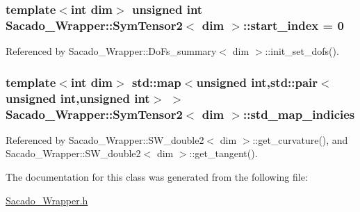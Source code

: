 \subsubsection[{\texorpdfstring{start\+\_\+index}{start_index}}]{\setlength{\rightskip}{0pt plus 5cm}template$<$int dim$>$ unsigned {\bf int} {\bf Sacado\+\_\+\+Wrapper\+::\+Sym\+Tensor2}$<$ dim $>$\+::start\+\_\+index = 0}\hypertarget{classSacado__Wrapper_1_1SymTensor2_ab14d036243a7505e918af354b1cb74d9}{}\label{classSacado__Wrapper_1_1SymTensor2_ab14d036243a7505e918af354b1cb74d9}


Referenced by Sacado\+\_\+\+Wrapper\+::\+Do\+Fs\+\_\+summary$<$ dim $>$\+::init\+\_\+set\+\_\+dofs().

\subsubsection[{\texorpdfstring{std\+\_\+map\+\_\+indicies}{std_map_indicies}}]{\setlength{\rightskip}{0pt plus 5cm}template$<$int dim$>$ std\+::map$<$unsigned {\bf int},std\+::pair$<$unsigned {\bf int},unsigned {\bf int}$>$ $>$ {\bf Sacado\+\_\+\+Wrapper\+::\+Sym\+Tensor2}$<$ dim $>$\+::std\+\_\+map\+\_\+indicies}\hypertarget{classSacado__Wrapper_1_1SymTensor2_a1c6b89438714315ae209f4687b687505}{}\label{classSacado__Wrapper_1_1SymTensor2_a1c6b89438714315ae209f4687b687505}


Referenced by Sacado\+\_\+\+Wrapper\+::\+S\+W\+\_\+double2$<$ dim $>$\+::get\+\_\+curvature(), and Sacado\+\_\+\+Wrapper\+::\+S\+W\+\_\+double2$<$ dim $>$\+::get\+\_\+tangent().



The documentation for this class was generated from the following file\+:\begin{DoxyCompactItemize}
\item 
\hyperlink{Sacado__Wrapper_8h}{Sacado\+\_\+\+Wrapper.\+h}\end{DoxyCompactItemize}
